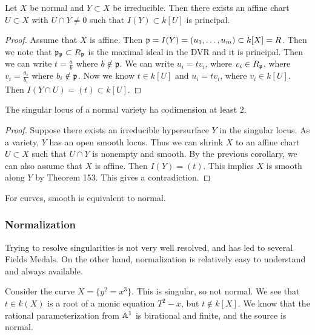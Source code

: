 \documentclass[twoside, 10pt]{article}
\begin{document}
        \begin{cor}
            Let $X$ be normal and $Y \subset X$ be irreducible. Then there exists an affine chart $U \subset X$ with $U \cap Y \neq 0$ such that $I(Y) \subset k[U]$ is principal.
            \begin{proof}
                Assume that $X$ is affine. Then $\mathfrak{p} = I(Y) = (u_1, \ldots, u_m) \subset k[X] = R$. Then we note that $\mathfrak{p}_{\mathfrak{p}} \subset R_{\mathfrak{p}}$ is the maximal ideal in the DVR and it is principal. Then we can write $t = \frac{a}{b}$ where $b \notin \mathfrak{p}$. We can write $u_i = tv_i$, where $v_i \in R_{\mathfrak{p}}$, where $v_i = \frac{a_i}{b_i}$ where $b_i \notin \mathfrak{p}$. Now we know $t \in k[U]$ and $u_i = tv_i$, where $v_i \in k[U]$. Then $I(Y \cap U) = (t) \subset k[U]$.
            \end{proof}
        \end{cor}

        \begin{cor}
            The singular locus of a normal variety ha codimension at least $2$.
            \begin{proof}
                Suppose there exists an irreducible hypersurface $Y$ in the singular locus. As a variety, $Y$ has an open smooth locus. Thus we can shrink $X$ to an affine chart $U \subset X$ such that $U \cap Y$ is nonempty and smooth. By the previous corollary, we can also assume that $X$ is affine. Then $I(Y) = (t)$. This implies $X$ is smooth along $Y$ by Theorem 153. This gives a contradiction.
            \end{proof}
        \end{cor}

        \begin{cor}
            For curves, smooth is equivalent to normal.
        \end{cor}

        \subsubsection{Normalization}
        Trying to resolve singularities is not very well resolved, and has led to several Fields Medals. On the other hand, normalization is relatively easy to understand and always available.
        \begin{exm}
            Consider the curve $X = \{y^2=x^3\}$. This is singular, so not normal. We see that $t \in k(X)$ is a root of a monic equation $T^2-x$, but $t \notin k[X]$. We know that the rational parameterization from $\mathbb{A}^1$ is birational and finite, and the source is normal.
        \end{exm}
\end{document}
